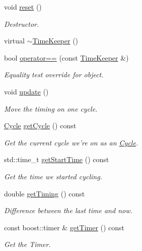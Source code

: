 \begin{DoxyCompactItemize}
\item 
void \hyperlink{classcryomesh_1_1common_1_1TimeKeeper_abb7b3042e8b2087326c2405a0bc8d230}{reset} ()
\begin{DoxyCompactList}\small\item\em \-Destructor. \end{DoxyCompactList}\item 
virtual \hyperlink{classcryomesh_1_1common_1_1TimeKeeper_a1023707129088652ac2cced3e0f4a0be}{$\sim$\-Time\-Keeper} ()
\item 
bool \hyperlink{classcryomesh_1_1common_1_1TimeKeeper_a7c710ae8bdb2fff0aaf284a9c1108ace}{operator==} (const \hyperlink{classcryomesh_1_1common_1_1TimeKeeper}{\-Time\-Keeper} \&)
\begin{DoxyCompactList}\small\item\em \-Equality test override for object. \end{DoxyCompactList}\item 
void \hyperlink{classcryomesh_1_1common_1_1TimeKeeper_a0581cd24a6eebfbdd67a363467483456}{update} ()
\begin{DoxyCompactList}\small\item\em \-Move the timing on one cycle. \end{DoxyCompactList}\item 
\hyperlink{classcryomesh_1_1common_1_1Cycle}{\-Cycle} \hyperlink{classcryomesh_1_1common_1_1TimeKeeper_aa0bfaecbd5118af91d63296f158cee09}{get\-Cycle} () const 
\begin{DoxyCompactList}\small\item\em \-Get the current cycle we're on as an \hyperlink{classcryomesh_1_1common_1_1Cycle}{\-Cycle}. \end{DoxyCompactList}\item 
std\-::time\-\_\-t \hyperlink{classcryomesh_1_1common_1_1TimeKeeper_a73a685a859e69ce3660b6a6d3469997e}{get\-Start\-Time} () const 
\begin{DoxyCompactList}\small\item\em \-Get the time we started cycling. \end{DoxyCompactList}\item 
double \hyperlink{classcryomesh_1_1common_1_1TimeKeeper_ad3f49c5602d1e51b4ee9aa9535a59454}{get\-Timing} () const 
\begin{DoxyCompactList}\small\item\em \-Difference between the last time and now. \end{DoxyCompactList}\item 
const boost\-::timer \& \hyperlink{classcryomesh_1_1common_1_1TimeKeeper_a888f7db463cc84b0a00478c4bbcf7c44}{get\-Timer} () const 
\begin{DoxyCompactList}\small\item\em \-Get the \-Timer. \end{DoxyCompactList}\end{DoxyCompactItemize}

